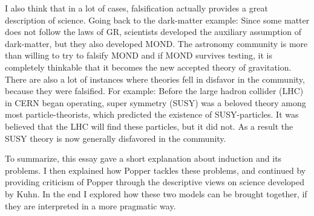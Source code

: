 I also think that in a lot of cases, falsification actually
provides a great description of science.
Going back to the dark-matter example:
Since some matter does not follow the laws of GR,
scientists developed the auxiliary assumption of dark-matter, but
they also developed MOND. The astronomy community is more than willing
to try to falsify MOND and if MOND survives testing, it is completely
thinkable that it becomes the new accepted theory of gravitation.
There are also a lot of instances where theories fell in
disfavor in the community, because they were falsified.
For example: Before the large hadron collider (LHC) in CERN began operating,
super symmetry (SUSY) was a beloved theory among most particle-theorists, which
predicted the existence of SUSY-particles.
It was believed that the LHC will find these particles, but it did not.
As a result the SUSY theory is now generally disfavored in the community.



To summarize, this essay gave a short explanation about induction and its problems.
I then explained how Popper tackles these problems, and continued by
providing criticism of Popper through the descriptive
views on science developed by Kuhn.
In the end I explored how these two models can be brought together,
if they are interpreted in a more pragmatic way.